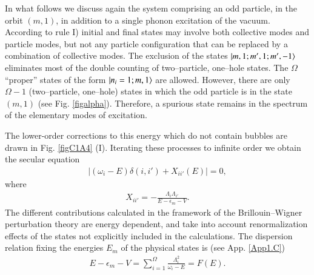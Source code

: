 In what follows we discuss again the system comprising an odd particle, in the orbit $(m, 1)$, in addition to a single phonon excitation of the vacuum. 
According to rule I) initial and final states may involve both collective modes and particle modes, but not any particle configuration that can be replaced by a combination of collective modes. The exclusion of the states $|{m,1; m',1;m',-1} \rangle$ eliminates most of the double counting of two--particle, one--hole states. The $\Omega$ ``proper'' states of the form $|{n_i=1;m,1} \rangle$ are allowed. However, 
there are only $\Omega-1$ (two--particle, one--hole) states in which the odd particle is in the state $(m, 1)$ (see Fig. \ref{figalpha}). Therefore, a spurious state remains in the spectrum of the elementary modes of excitation. 



The lower-order corrections to this energy which do not contain bubbles 
are drawn in Fig. \ref{figC1A4} (I). Iterating these processes to infinite order we obtain the secular equation 
  \begin{align}\label{eqC1A56} 
\left|(\omega_i-E)\delta(i,i')+X_{ii'}(E)\right|=0,
  \end{align} 
  where
    \begin{align}\label{eqC1A57} 
   X_{ii'}=-\frac{\Lambda_i\Lambda_{i'}}{E-\epsilon_m-V}.
    \end{align} 
The different contributions calculated in the framework of the Brillouin--Wigner perturbation theory are energy dependent, and take into account renormalization effects of the states not explicitly included in the calculations. The dispersion relation fixing the energies $E_m$ of the physical states is (see App. \ref{App1.C})
  \begin{align}\label{eqC1A60} 
 E-\epsilon_m-V=\sum_{i=1}^{\Omega}\frac{\Lambda_i^2}{\omega_i-E}=F(E).
  \end{align} 


